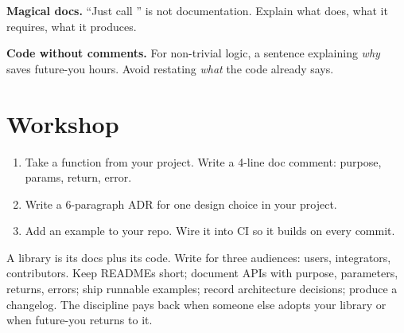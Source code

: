 \begin{warning}
\textbf{Magical docs.} ``Just call '' is not
documentation. Explain what  does, what it requires,
what it produces.
\end{warning}

\begin{warning}
\textbf{Code without comments.} For non-trivial logic, a
sentence explaining \emph{why} saves future-you hours. Avoid
restating \emph{what} the code already says.
\end{warning}

\section*{Workshop}

\begin{enumerate}[leftmargin=*]
  \item Take a function from your project. Write a 4-line
    doc comment: purpose, params, return, error.
  \item Write a 6-paragraph ADR for one design choice in your
    project.
  \item Add an example to your repo. Wire it into CI so it
    builds on every commit.
\end{enumerate}

\begin{recap}
A library is its docs plus its code. Write for three audiences:
users, integrators, contributors. Keep READMEs short; document
APIs with purpose, parameters, returns, errors; ship runnable
examples; record architecture decisions; produce a changelog.
The discipline pays back when someone else adopts your library
or when future-you returns to it.
\end{recap}
